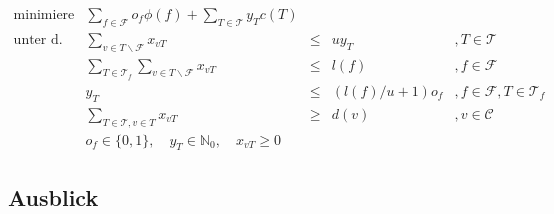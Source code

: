 \documentclass[a4paper,ngerman,12pt,bibtotoc]{scrartcl}
\theoremstyle{definition}
\theoremstyle{plain}
\theoremstyle{remark}
\newcommand{\IN}{\mathbb{N}}
\newcommand{\ClientSet}{\mathscr{C}}
\newcommand{\FacilitySet}{\mathscr{F}}
\newcommand{\allTours}{\mathscr{T}}
\begin{document}
	\begin{align*}
		\text{minimiere} 	&\sum_{f \in \FacilitySet} o_f \phi(f) + \sum_{T \in \allTours} y_T c(T)&	  &		& 										\\
		\text{unter d. N.:} &\sum_{v \in T\backslash\FacilitySet} x_{vT} 							&\leq &u y_T &, T \in \allTours 					\\
							&\sum_{T \in \allTours_f} \sum_{v \in T\backslash\FacilitySet} x_{vT} 	&\leq &l(f) 	&, f \in \FacilitySet				\\
							&y_T 											&\leq &\left(l(f)/u + 1\right)o_f	&, f \in \FacilitySet, T \in \allTours_f \\
							&\sum_{T \in \allTours, v \in T} x_{vT} 								&\geq &d(v)	&, v \in \ClientSet						\\
							&o_f \in \{0,1\},\quad y_T \in \IN_0, \quad x_{vT} \geq 0				& 	  &		&
	\end{align*}


	\subsection{Ausblick}
	
	
	

\newpage	
\listoftodos

\newpage
\nocite{*}
\printbibliography		
			
\end{document}
